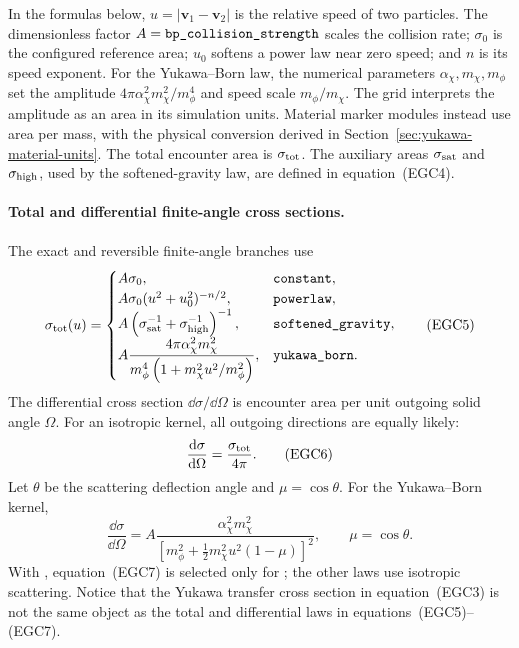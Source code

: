 In the formulas below, \(u=|\boldsymbol v_1-\boldsymbol v_2|\) is the
relative speed of two particles.  The dimensionless factor
\(A=\code{bp_collision_strength}\) scales the collision rate;
\(\sigma_0\) is the configured reference area; \(u_0\) softens a power law
near zero speed; and \(n\) is its speed exponent.  For the Yukawa--Born law,
the numerical parameters \(\alpha_\chi,m_\chi,m_\phi\) set the amplitude
\(4\pi\alpha_\chi^2m_\chi^2/m_\phi^4\) and speed scale
\(m_\phi/m_\chi\).  The grid interprets the amplitude as an area in its
simulation units.  Material marker modules instead use area per mass, with
the physical conversion derived in Section~\ref{sec:yukawa-material-units}.
The total encounter area is
\(\sigma_{\rm tot}\).  The auxiliary areas \(\sigma_{\rm sat}\) and
\(\sigma_{\rm high}\), used by the softened-gravity law, are defined in
equation~(EGC4).

\paragraph{Total and differential finite-angle cross sections.}
The exact and reversible finite-angle branches use
\[
 \sigma_{\rm tot}(u)=
 \begin{cases}
 A\sigma_0,
   &\code{constant},\\
 A\sigma_0(u^2+u_0^2)^{-n/2},
   &\code{powerlaw},\\
 A\left(\sigma_{\rm sat}^{-1}+\sigma_{\rm high}^{-1}\right)^{-1},
   &\code{softened_gravity},\\
 \displaystyle
 A\frac{4\pi\alpha_\chi^2m_\chi^2}
 {m_\phi^4\left(1+m_\chi^2u^2/m_\phi^2\right)},
   &\code{yukawa_born}.
 \end{cases}                                             \tag{EGC5}
\]
The differential cross section \(\dd\sigma/\dd\Omega\) is encounter area per
unit outgoing solid angle \(\Omega\).  For an isotropic kernel, all outgoing
directions are equally likely:
\[
 \frac{\mathrm d\sigma}{\mathrm d\Omega}=\frac{\sigma_{\rm tot}}{4\pi}.
                                                               \tag{EGC6}
\]
Let \(\theta\) be the scattering deflection angle and
\(\mu=\cos\theta\).  For the Yukawa--Born kernel,
\[
 \frac{\dd\sigma}{\dd\Omega}
 =
 A\frac{\alpha_\chi^2m_\chi^2}
 {\left[m_\phi^2+\frac12m_\chi^2u^2(1-\mu)\right]^2},
 \qquad \mu=\cos\theta.                                  \tag{EGC7}
\]
With , equation~(EGC7) is selected only for
; the other laws use isotropic scattering.
Notice that the Yukawa transfer cross section in equation~(EGC3) is not the
same object as the total and differential laws in equations~(EGC5)--(EGC7).


